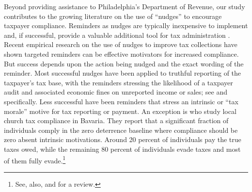 \documentclass[12pt]{article}
\begin{document}
Beyond providing assistance to Philadelphia's Department of Revenue,
our study contributes to the growing literature on the use of
``nudges'' to encourage taxpayer compliance.  Reminders as nudges are
typically inexpensive to implement and, if successful, provide a
valuable additional tool for tax administration
\cite{keen2016optimal}.  Recent empirical research on the use of
nudges to improve tax collections have shown targeted reminders can be
effective motivators for increased compliance.  But success depends
upon the action being nudged and the exact wording of the reminder.
Most successful nudges have been applied to truthful reporting of the
taxpayer's tax base, with the reminders stressing the likelihood of a
taxpayer audit and associated economic fines on unreported income or
sales; see  and  specifically.
Less successful have been reminders that stress an intrinsic or ``tax
morale'' motive for tax reporting or payment. An exception is
 who study local church tax compliance in
Bavaria. They report that a significant fraction of individuals comply
in the zero deterrence baseline where compliance should be zero absent
intrinsic motivations. Around 20 percent of individuals pay the true
taxes owed, while the remaining 80 percent of individuals evade taxes
and most of them fully evade.\footnote{See, also,
   and  for a review.}
\end{document}
